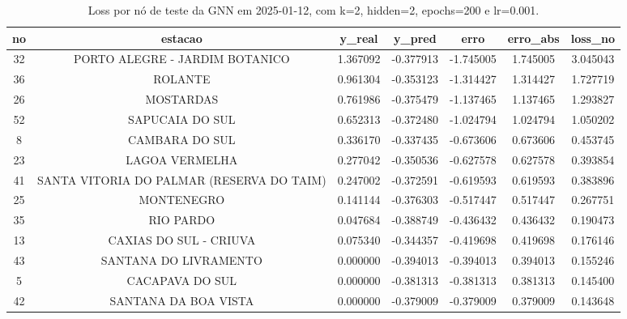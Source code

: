 \begin{table}[h]
\centering
\caption{Loss por nó de teste da GNN em 2025-01-12, com k=2, hidden=2, epochs=200 e lr=0.001.}
\label{tab:gnn_loss_nodes_k2_hidden2}
\begin{tabular}{ccccccc}
\toprule
no & estacao & y\_real & y\_pred & erro & erro\_abs & loss\_no \\
\midrule
32 & PORTO ALEGRE - JARDIM BOTANICO & 1.367092 & -0.377913 & -1.745005 & 1.745005 & 3.045043 \\
36 & ROLANTE & 0.961304 & -0.353123 & -1.314427 & 1.314427 & 1.727719 \\
26 & MOSTARDAS & 0.761986 & -0.375479 & -1.137465 & 1.137465 & 1.293827 \\
52 & SAPUCAIA DO SUL & 0.652313 & -0.372480 & -1.024794 & 1.024794 & 1.050202 \\
8 & CAMBARA DO SUL & 0.336170 & -0.337435 & -0.673606 & 0.673606 & 0.453745 \\
23 & LAGOA VERMELHA & 0.277042 & -0.350536 & -0.627578 & 0.627578 & 0.393854 \\
41 & SANTA VITORIA DO PALMAR (RESERVA DO TAIM) & 0.247002 & -0.372591 & -0.619593 & 0.619593 & 0.383896 \\
25 & MONTENEGRO & 0.141144 & -0.376303 & -0.517447 & 0.517447 & 0.267751 \\
35 & RIO PARDO & 0.047684 & -0.388749 & -0.436432 & 0.436432 & 0.190473 \\
13 & CAXIAS DO SUL - CRIUVA & 0.075340 & -0.344357 & -0.419698 & 0.419698 & 0.176146 \\
43 & SANTANA DO LIVRAMENTO & 0.000000 & -0.394013 & -0.394013 & 0.394013 & 0.155246 \\
5 & CACAPAVA DO SUL & 0.000000 & -0.381313 & -0.381313 & 0.381313 & 0.145400 \\
42 & SANTANA DA BOA VISTA & 0.000000 & -0.379009 & -0.379009 & 0.379009 & 0.143648 \\
\bottomrule
\end{tabular}
\end{table}
